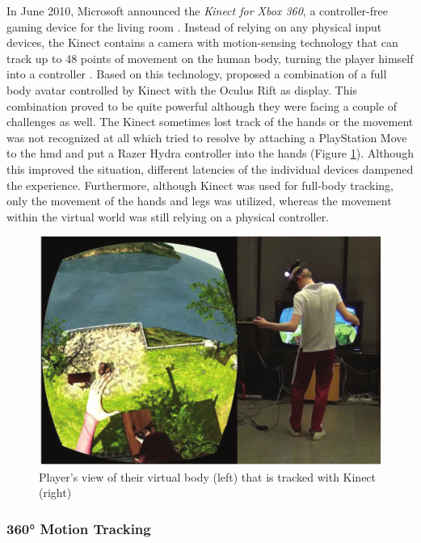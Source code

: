 In June 2010, Microsoft announced the \textit{Kinect for Xbox 360}, a controller-free gaming device for the living room \citep{Microsoft2010}. Instead of relying on any physical input devices, the Kinect contains a camera with motion-sensing technology that can track up to 48 points of movement on the human body, turning the player himself into a controller \citep{Microsoft2010}. \newline
Based on this technology, \cite{Takala2014} proposed a combination of a full body avatar controlled by Kinect with the Oculus Rift as display. This combination proved to be quite powerful although they were facing a couple of challenges as well. The Kinect sometimes lost track of the hands or the movement was not recognized at all which \cite{Takala2014} tried to resolve by attaching a PlayStation Move to the \gls{hmd} and put a Razer Hydra controller into the hands (Figure \ref{fig:kinectbody}). Although this improved the situation, different latencies of the individual devices dampened the experience. Furthermore, although Kinect was used for full-body tracking, only the movement of the hands and legs was utilized, whereas the movement within the virtual world was still relying on a physical controller.
\begin{figure}[t]
	\begin{center}
		\includegraphics[width=12cm]{03_Figures/05_LitReview/Takala2014_KinectBody.png}
		\caption[Player's view of their virtual body that is tracked with Kinect]{Player's view of their virtual body (left) that is tracked with Kinect (right) \citep{Takala2014}}
		\label{fig:kinectbody}
	\end{center}
\end{figure}


\subsubsection{360° Motion Tracking}
\label{360MotionTracking}

